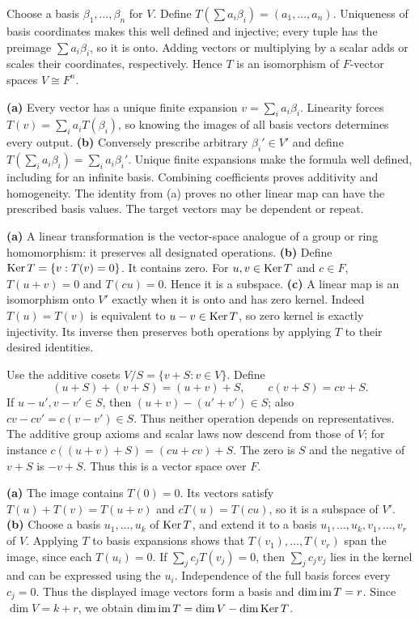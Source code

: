 Choose a basis $\beta_1,\ldots,\beta_n$ for $V$. Define $T(\sum a_i\beta_i)=(a_1,\ldots,a_n)$. Uniqueness of basis coordinates makes this well defined and injective; every tuple has the preimage $\sum a_i\beta_i$, so it is onto. Adding vectors or multiplying by a scalar adds or scales their coordinates, respectively. Hence $T$ is an isomorphism of $F$-vector spaces $V\cong F^n$.

\textbf{(a)} Every vector has a unique finite expansion $v=\sum_i a_i\beta_i$. Linearity forces $T(v)=\sum_i a_iT(\beta_i)$, so knowing the images of all basis vectors determines every output.
\textbf{(b)} Conversely prescribe arbitrary $\beta_i'\in V'$ and define $T(\sum_i a_i\beta_i)=\sum_i a_i\beta_i'$. Unique finite expansions make the formula well defined, including for an infinite basis. Combining coefficients proves additivity and homogeneity. The identity from (a) proves no other linear map can have the prescribed basis values. The target vectors may be dependent or repeat.

\textbf{(a)} A linear transformation is the vector-space analogue of a group or ring homomorphism: it preserves all designated operations.
\textbf{(b)} Define $\operatorname{Ker} T=\{v:T(v)=0\}$. It contains zero. For $u,v\in\operatorname{Ker} T$ and $c\in F$, $T(u+v)=0$ and $T(cu)=0$. Hence it is a subspace.
\textbf{(c)} A linear map is an isomorphism onto $V'$ exactly when it is onto and has zero kernel. Indeed $T(u)=T(v)$ is equivalent to $u-v\in\operatorname{Ker} T$, so zero kernel is exactly injectivity. Its inverse then preserves both operations by applying $T$ to their desired identities.

Use the additive cosets $V/S=\{v+S:v\in V\}$. Define
\[(u+S)+(v+S)=(u+v)+S,\qquad c(v+S)=cv+S.\]
If $u-u',v-v'\in S$, then $(u+v)-(u'+v')\in S$; also $cv-cv'=c(v-v')\in S$. Thus neither operation depends on representatives. The additive group axioms and scalar laws now descend from those of $V$; for instance $c((u+v)+S)=(cu+cv)+S$. The zero is $S$ and the negative of $v+S$ is $-v+S$. Thus this is a vector space over $F$.

\textbf{(a)} The image contains $T(0)=0$. Its vectors satisfy $T(u)+T(v)=T(u+v)$ and $cT(u)=T(cu)$, so it is a subspace of $V'$.
\textbf{(b)} Choose a basis $u_1,\ldots,u_k$ of $\operatorname{Ker} T$, and extend it to a basis $u_1,\ldots,u_k,v_1,\ldots,v_r$ of $V$. Applying $T$ to basis expansions shows that $T(v_1),\ldots,T(v_r)$ span the image, since each $T(u_i)=0$.
If $\sum_j c_jT(v_j)=0$, then $\sum_j c_jv_j$ lies in the kernel and can be expressed using the $u_i$. Independence of the full basis forces every $c_j=0$. Thus the displayed image vectors form a basis and $\dim\operatorname{im} T=r$. Since $\dim V=k+r$, we obtain $\dim\operatorname{im} T=\dim V-\dim\operatorname{Ker} T$.
